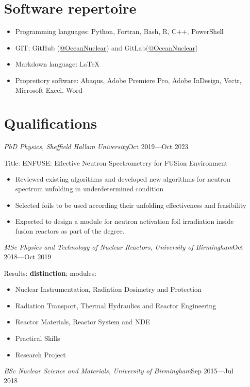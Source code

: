 \documentclass[a4paper, 12pt]{article}
\newcommand{\expentry}[3]{\emph{#1}\hfill{#2}---{#3}}
\begin{document}
\section{Software repertoire} %
    \begin{itemize}
    \item Programming languages: Python, Fortran, Bash, R, C++, PowerShell
    \item GIT: GitHub (\href{https://github.com/OceanNuclear}{@OceanNuclear}) and GitLab(\href{https://gitlab.com/OceanNuclear}{@OceanNuclear})
    \item Markdown language: LaTeX
    \item Propreitory software: Abaqus, Adobe Premiere Pro, Adobe InDesign, Vectr, Microsoft Excel, Word
    \end{itemize}

\section{Qualifications}
\expentry{PhD Physics, Sheffield Hallam University}{Oct 2019}{Oct 2023}
    
    Title: ENFUSE: Effective Neutron Spectrometery for FUSion Environment
    \begin{itemize}
    \setlength\itemsep{0em}
    \item Reviewed existing algorithms and developed new algorithms for neutron spectrum unfolding in underdetermined condition
    \item Selected foils to be used according their unfolding effectiveness and feasibility
    \item Expected to design a module for neutron activation foil irradiation inside fusion reactors as part of the degree.
    \end{itemize}
\begin{adjustwidth}{-0.3cm}{-0.7cm} %
\expentry{MSc Physics and Technology of Nuclear Reactors, University of Birmingham}{Oct 2018}{Oct 2019}
\end{adjustwidth} %

    Results: \textbf{distinction}; modules:
    \begin{itemize}
    \setlength\itemsep{0em}
    \item Nuclear Instrumentation, Radiation Dosimetry and Protection
    \item Radiation Transport, Thermal Hydraulics and Reactor Engineering
    \item Reactor Materials, Reactor System and NDE
    \item Practical Skills
    \item Research Project
    \end{itemize}
\expentry{BSc Nuclear Science and Materials, University of Birmingham} {Sep 2015}{Jul 2018}
\end{document}
